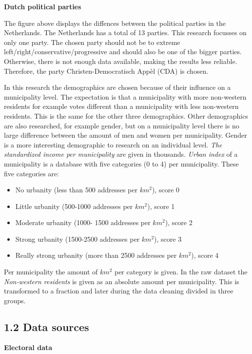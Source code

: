 \documentclass[11pt,]{article}
\begin{document}
\textbf{Dutch political parties}

The figure above displays the diffences between the political parties in
the Netherlands. The Netherlands has a total of 13 parties. This
research focusses on only one party. The chosen party should not be to
extreme left/right/conservative/progressive and should also be one of
the bigger parties. Otherwise, there is not enough data available,
making the results less reliable. Therefore, the party
Christen-Democratisch Appèl (CDA) is chosen.

In this research the demographics are chosen because of their influence
on a municipality level. The expectation is that a municipality with
more non-western residents for example votes different than a
municipality with less non-western residents. This is the same for the
other three demographics. Other demographics are also researched, for
example gender, but on a municipality level there is no large difference
between the amount of men and women per municipality. Gender is a more
interesting demographic to research on an individual level. \emph{The
standardized income per municipality} are given in thousands.
\emph{Urban index} of a municipality is a database with five categories
(0 to 4) per municipality. These five categories are:

\begin{itemize}
\item No urbanity (less than 500 addresses per $km^2$), score 0
\item Little urbanity (500-1000 addresses per $km^2$), score 1
\item Moderate urbanity (1000- 1500 addresses per $km^2$), score 2
\item Strong urbanity (1500-2500 addresses per $km^2$), score 3
\item Really strong urbanity (more than 2500 addresses per $km^2$), score 4
\end{itemize}

Per municipality the amount of \(km^2\) per category is given. In the
raw dataset the \emph{Non-western residents} is given as an absolute
amount per municipality. This is transformed to a fraction and later
during the data cleaning divided in three groups.

\subsection{1.2 Data sources}\label{data-sources}

\textbf{Electoral data}
\end{document}
